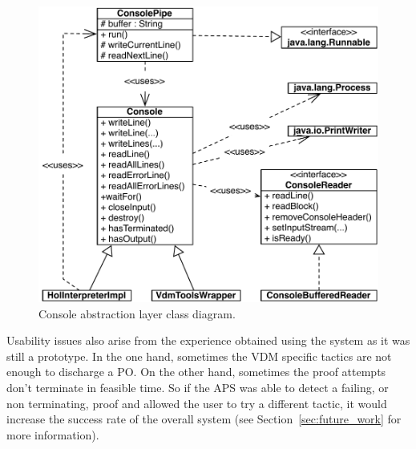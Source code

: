 \documentclass[]{article}
\begin{document}
\begin{figure}
  \begin{center}
    \includegraphics[width=.8\textwidth]{images/aps_console_class_diagram.pdf}
    \caption[Console asbtraction class diagram]{Console abstraction layer class diagram.}
    \label{fig:aps_console_class}
  \end{center}
\end{figure}

Usability issues also arise from the experience obtained using the system as it was still a prototype.
In the one hand, sometimes the VDM specific tactics are not enough to discharge a PO.
On the other hand, sometimes the proof attempts don't terminate in feasible time.
So if the APS was able to detect a failing, or non terminating, proof and allowed the user to try a different tactic, it would increase the success rate of the overall system (see Section~\ref{sec:future_work} for more information).
\end{document}
